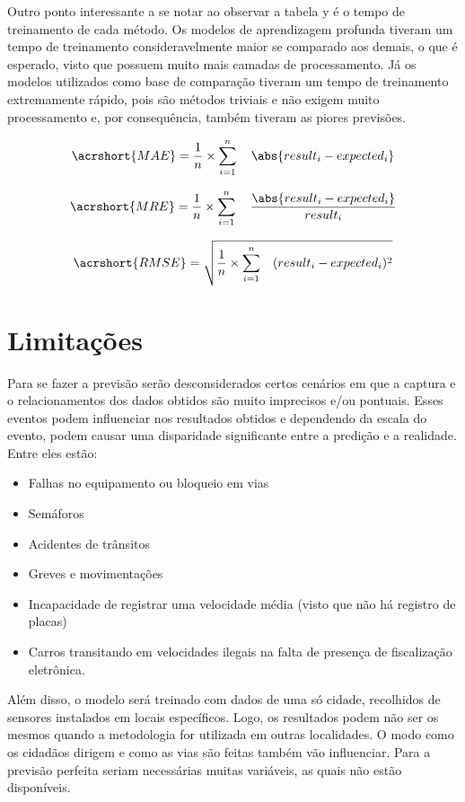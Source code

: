 Outro  ponto  interessante  a  se  notar ao observar a tabela y  é  o  tempo  de  treinamento de cada método. Os modelos de aprendizagem profunda tiveram um tempo de treinamento consideravelmente maior se comparado aos demais, o que é esperado, visto que possuem muito mais camadas de processamento. Já os  modelos  utilizados  como  base  de  comparação  tiveram um  tempo  de treinamento  extremamente  rápido,  pois  são métodos triviais  e  não  exigem  muito  processamento  e,  por consequência, também tiveram as piores previsões.


\begin{equation}
\acrshort{MAE} = \frac{1}{n} \times \sum_{i=1}^{n} \quad \abs{result_i - expected_i}
\end{equation}

\begin{equation}
\acrshort{MRE} = \frac{1}{n} \times \sum_{i=1}^{n} \quad \frac{\abs{result_i - expected_i}}{result_i}
\end{equation}

\begin{equation}
\acrshort{RMSE} = \sqrt{ \frac{1}{n} \times \sum_{i=1}^{n} \quad (result_i - expected_i) ^ 2}
\end{equation}
    
\section{Limitações}
Para se fazer a previsão serão desconsiderados certos cenários em que a captura e o relacionamentos dos dados obtidos são muito imprecisos e/ou pontuais. Esses eventos podem influenciar nos resultados obtidos e dependendo da escala do evento, podem causar uma disparidade significante entre a predição e a realidade. Entre eles estão:
\begin{itemize}
    \item Falhas no equipamento ou bloqueio em vias
    \item Semáforos
    \item Acidentes de trânsitos
    \item Greves e movimentações
    \item Incapacidade de registrar uma velocidade média (visto que não há registro de placas)
    \item Carros transitando em velocidades ilegais na falta de presença de fiscalização eletrônica.
\end{itemize}
Além disso, o modelo será treinado com dados de uma só cidade, recolhidos de sensores instalados em locais específicos. Logo, os resultados podem não ser os mesmos quando a metodologia for utilizada em outras localidades. O modo como os cidadãos dirigem e como as vias são feitas também vão influenciar. Para a previsão perfeita seriam necessárias muitas variáveis, as quais não estão disponíveis.

